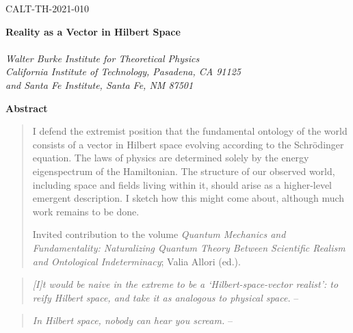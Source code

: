\documentclass[12pt,english]{article}
\begin{document}
\baselineskip=14pt
\hfill CALT-TH-2021-010
\hfill

\vspace{2cm}
\thispagestyle{empty}
\begin{center}
{\LARGE\bf
Reality as a Vector in Hilbert Space
}\\
\bigskip{} \\[7mm]
 {\it Walter Burke Institute for Theoretical Physics\\
    California Institute of Technology,
   Pasadena, CA 91125\\
   and Santa Fe Institute, Santa Fe, NM 87501} \\
 \end{center}
\bigskip
\centerline{\large\bf Abstract}

\begin{quote} \small
I defend the extremist position that the fundamental ontology of the world consists of a vector in Hilbert space evolving according to the Schr\"odinger equation.
The laws of physics are determined solely by the energy eigenspectrum of the Hamiltonian.
The structure of our observed world, including space and fields living within it, should arise as a higher-level emergent description.
I sketch how this might come about, although much work remains to be done.

Invited contribution to the volume \emph{Quantum Mechanics and Fundamentality: Naturalizing Quantum Theory Between Scientific Realism and Ontological Indeterminacy}; Valia Allori (ed.).
\end{quote}


\newpage
\baselineskip=16pt
	
\setcounter{footnote}{0}

\begin{quote}
\emph{[I]t would be naive in the extreme to be a `Hilbert-space-vector realist': to reify Hilbert space, and take it as analogous to physical space.} 
-- \citet{wallace2017}
\end{quote}

\begin{quote}
\emph{In Hilbert space, nobody can hear you scream.} -- \citet{aharonov2005quantum}
\end{quote}


\end{document}
